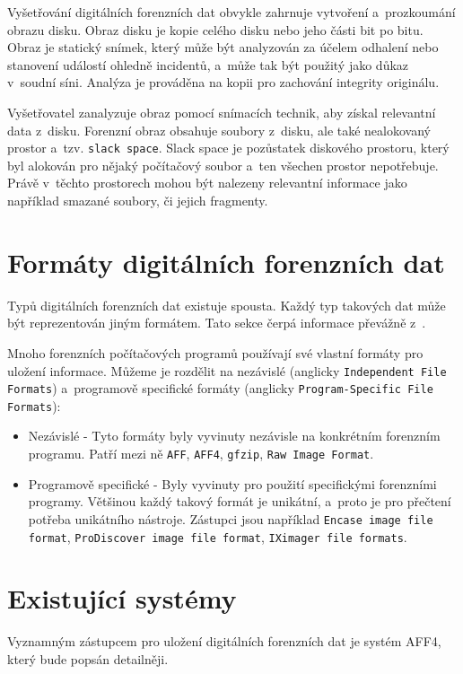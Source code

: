 \noindent Vyšetřování digitálních forenzních dat obvykle zahrnuje vytvoření a~prozkoumání obrazu disku. Obraz disku je kopie celého disku nebo jeho části bit po bitu. Obraz je statický snímek, který může být analyzován za účelem odhalení nebo stanovení událostí ohledně incidentů, a~může tak být použitý jako důkaz v~soudní síni. Analýza je prováděna na kopii pro zachování integrity originálu.

Vyšetřovatel zanalyzuje obraz pomocí snímacích technik, aby získal relevantní data z~disku. Forenzní obraz obsahuje soubory z~disku, ale také nealokovaný prostor a~tzv. \texttt{slack space}. Slack space je pozůstatek diskového prostoru, který byl alokován pro nějaký počítačový soubor a~ten všechen prostor nepotřebuje. Právě v~těchto prostorech mohou být nalezeny relevantní informace jako například smazané soubory, či jejich fragmenty. \cite{forensicImages}

\section{Formáty digitálních forenzních dat}
Typů digitálních forenzních dat existuje spousta. Každý typ takových dat může být reprezentován jiným formátem. Tato sekce čerpá informace převážně z~\cite{forensicswikiForensicFF}.

Mnoho forenzních počítačových programů používají své vlastní formáty pro uložení informace. Můžeme je rozdělit na nezávislé (anglicky \texttt{Independent File Formats}) a~programově specifické formáty (anglicky \texttt{Program-Specific File Formats}):

\begin{itemize}
\item Nezávislé - Tyto formáty byly vyvinuty nezávisle na konkrétním forenzním programu. Patří mezi ně \texttt{AFF}, \texttt{AFF4}, \texttt{gfzip}, \texttt{Raw Image Format}.

\item Programově specifické - Byly vyvinuty pro použití specifickými forenzními programy. Většinou každý takový formát je unikátní, a~proto je pro přečtení potřeba unikátního nástroje.
Zástupci jsou například \texttt{Encase image file format}, \texttt{ProDiscover image file format}, \texttt{IXimager file formats}.
\end{itemize}

\section{Existující systémy}
Vyznamným zástupcem pro uložení digitálních forenzních dat je systém AFF4, který bude popsán detailněji.

